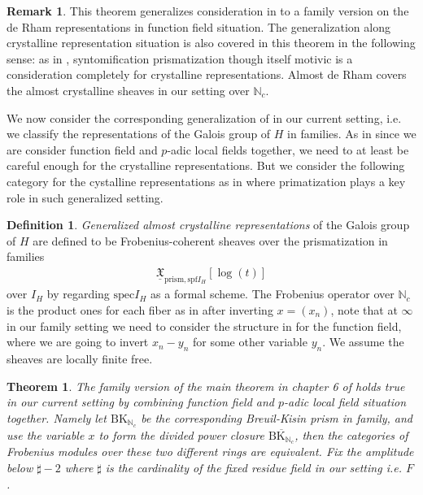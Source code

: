 \documentclass[12pt]{article}
\newtheorem{theorem}{Theorem}
\theoremstyle{definition}
\newtheorem{remark}{Remark}
\newtheorem{definition}{Definition}
\begin{document}
\begin{remark}
This theorem generalizes consideration in \cite{5HK} to a family version on the de Rham representations in function field situation. The generalization along crystalline representation situation is also covered in this theorem in the following sense: as in \cite{5BLA}, \cite{5BLB} syntomification prismatization though itself motivic is a consideration completely for crystalline representations. Almost de Rham covers the almost crystalline sheaves in our setting over $\mathbb{N}_c$. 
\end{remark}


\indent We now consider the corresponding generalization of \cite{5HK} in our current setting, i.e. we classify the representations of the Galois group of $H$ in families. As in \cite{5HK} since we are consider function field and $p$-adic local fields together, we need to at least be careful enough for the crystalline representations. But we consider the following category for the cystalline representations as in \cite{5HK} where primatization plays a key role in such generalized setting.

\begin{definition}
\textit{Generalized almost crystalline representations} of the Galois group of $H$ are defined to be Frobenius-coherent sheaves over the prismatization in families
\begin{align}
\underline{\mathfrak{X}}_{\mathrm{prism},\mathrm{spf}I_H}[\log(t)]
\end{align}
over $I_H$ by regarding $\mathrm{spec}I_H$ as a formal scheme. The Frobenius operator over $\mathbb{N}_c$ is the product ones for each fiber as in \cite{5HK} after inverting $x=(x_n)$, note that at $\infty$ in our family setting we need to consider the structure in \cite{5HK} for the function field, where we are going to invert $x_n-y_n$ for some other variable $y_n$. We assume the sheaves are locally finite free.
\end{definition}

\begin{theorem}
The family version of the main theorem in chapter 6 of \cite{5GL2} holds true in our current setting by combining function field and $p$-adic local field situation together. Namely let $\mathrm{BK}_{\mathbb{N}_c}$ be the corresponding Breuil-Kisin prism in family, and use the variable $x$ to form the divided power closure $\overline{\mathrm{BK}_{\mathbb{N}_c}}$, then the categories of Frobenius modules over these two different rings are equivalent. Fix the amplitude below $\sharp-2$ where $\sharp$ is the cardinality of the fixed residue field in our setting i.e. $F$.
\end{theorem}
\end{document}
